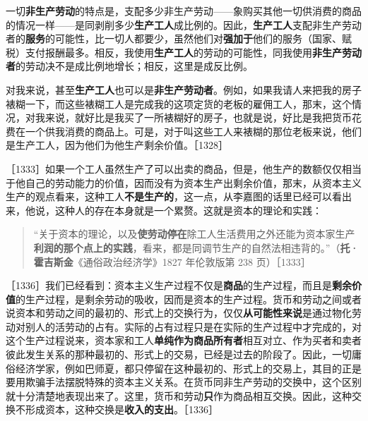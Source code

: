一切\textbf{非生产劳动}的特点是，支配多少非生产劳动——象购买其他一切供消费的商品的情况一样——是同剥削多少\textbf{生产工人}成比例的。因此，\textbf{生产工人}支配非生产劳动者的\textbf{服务}的可能性，比一切人都要少，虽然他们对\textbf{强加于}他们的服务（国家、赋税）支付报酬最多。相反，我使用\textbf{生产工人}的劳动的可能性，同我使用\textbf{非生产劳动者}的劳动决不是成比例地增长；相反，这里是成反比例。

对我来说，甚至\textbf{生产工人}也可以是\textbf{非生产劳动者}。例如，如果我请人来把我的房子裱糊一下，而这些裱糊工人是完成我的这项定货的老板的雇佣工人，那末，这个情况，对我来说，就好比是我买了一所裱糊好的房子，也就是说，好比是我把货币花费在一个供我消费的商品上。可是，对于叫这些工人来裱糊的那位老板来说，他们是生产工人，因为他们为他生产剩余价值。［1328］


［1333］如果一个工人虽然生产了可以出卖的商品，但是，他生产的数额仅仅相当于他自己的劳动能力的价值，因而没有为资本生产出剩余价值，那末，从资本主义生产的观点看来，这种工人\textbf{不是生产的}，这一点，从李嘉图的话里已经可以看出来，他说，这种人的存在本身就是一个累赘。这就是资本的理论和实践：

\begin{quote}“关于资本的理论，以及\textbf{使劳动停在}除工人生活费用之外还能为资本家生产\textbf{利润的那个点上的实践}，看来，都是同调节生产的自然法相违背的。”（\textbf{托·霍吉斯金}《通俗政治经济学》1827 年伦敦版第 238 页）［1333］\end{quote}


［1336］我们已经看到：资本主义生产过程不仅是\textbf{商品}的生产过程，而且是\textbf{剩余价值}的生产过程，是剩余劳动的吸收，因而是资本的生产过程。货币和劳动之间或者说资本和劳动之间的最初的、形式上的交换行为，仅仅\textbf{从可能性来说}是通过物化劳动对别人的活劳动的占有。实际的占有过程只是在实际的生产过程中才完成的，对这个生产过程说来，资本家和工人\textbf{单纯作为商品所有者}相互对立、作为买者和卖者彼此发生关系的那种最初的、形式上的交易，已经是过去的阶段了。因此，一切庸俗经济学家，例如巴师夏，都只停留在这种最初的、形式上的交易上，其目的正是要用欺骗手法摆脱特殊的资本主义关系。在货币同非生产劳动的交换中，这个区别就十分清楚地表现出来了。这里，货币和劳动\textbf{只}作为商品相互交换。因此，这种交换不形成资本，这种交换是\textbf{收入的支出}。［1336］


